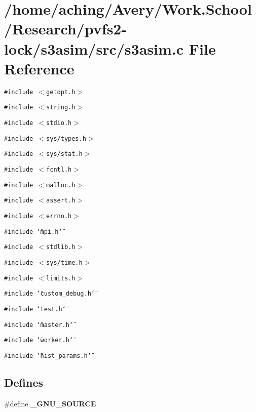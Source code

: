 \section{/home/aching/Avery/Work.School/Research/pvfs2-lock/s3asim/src/s3asim.c File Reference}
\label{s3asim_8c}
{\tt \#include $<$getopt.h$>$}\par
{\tt \#include $<$string.h$>$}\par
{\tt \#include $<$stdio.h$>$}\par
{\tt \#include $<$sys/types.h$>$}\par
{\tt \#include $<$sys/stat.h$>$}\par
{\tt \#include $<$fcntl.h$>$}\par
{\tt \#include $<$malloc.h$>$}\par
{\tt \#include $<$assert.h$>$}\par
{\tt \#include $<$errno.h$>$}\par
{\tt \#include \char`\"{}mpi.h\char`\"{}}\par
{\tt \#include $<$stdlib.h$>$}\par
{\tt \#include $<$sys/time.h$>$}\par
{\tt \#include $<$limits.h$>$}\par
{\tt \#include \char`\"{}custom\_\-debug.h\char`\"{}}\par
{\tt \#include \char`\"{}test.h\char`\"{}}\par
{\tt \#include \char`\"{}master.h\char`\"{}}\par
{\tt \#include \char`\"{}worker.h\char`\"{}}\par
{\tt \#include \char`\"{}hist\_\-params.h\char`\"{}}\par
\subsection*{Defines}
\begin{CompactItemize}
\item 
\#define \bf{\_\-GNU\_\-SOURCE}
\end{CompactItemize}

